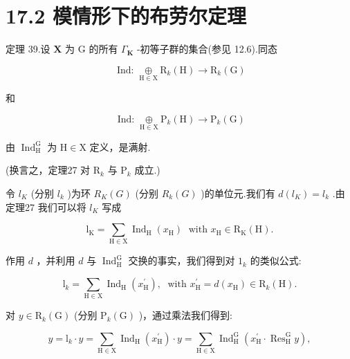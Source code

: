 \documentclass[10pt]{article}
\begin{document}
\section*{17.2 模情形下的布劳尔定理}

定理 39.设 \(\mathbf{X}\) 为 \(\mathrm{G}\) 的所有 \({\Gamma }_{\mathbf{K}}\) -初等子群的集合(参见 12.6).同态

\[
\text{ Ind: }\mathop{\oplus }\limits_{{\mathrm{H} \in  \mathrm{X}}}{\mathrm{R}}_{k}\left( \mathrm{H}\right)  \rightarrow  {\mathrm{R}}_{k}\left( \mathrm{G}\right)
\]

和

\[
\text{ Ind: }\mathop{\oplus }\limits_{{\mathrm{H} \in  \mathrm{X}}}{\mathrm{P}}_{k}\left( \mathrm{H}\right)  \rightarrow  {\mathrm{P}}_{k}\left( \mathrm{G}\right)
\]

由 \({\operatorname{Ind}}_{\mathrm{H}}^{\mathrm{G}}\) 为 \(\mathrm{H} \in  \mathrm{X}\) 定义，是满射.

(换言之，定理27 对 \({\mathrm{R}}_{k}\) 与 \({\mathrm{P}}_{k}\) 成立.)

令 \({l}_{K}\) (分别 \({l}_{k}\) )为环 \({R}_{K}\left( G\right)\) (分别 \({R}_{k}\left( G\right)\) )的单位元.我们有 \(d\left( {l}_{K}\right)  = {l}_{k}\) .由定理27 我们可以将 \({l}_{K}\) 写成

\[
{\mathrm{l}}_{\mathrm{K}} = \mathop{\sum }\limits_{{\mathrm{H} \in  \mathrm{X}}}{\operatorname{Ind}}_{\mathrm{H}}\left( {x}_{\mathrm{H}}\right) \;\text{ with }{x}_{\mathrm{H}} \in  {\mathrm{R}}_{\mathrm{K}}\left( \mathrm{H}\right) .
\]

作用 \(d\) ，并利用 \(d\) 与 \({\operatorname{Ind}}_{\mathrm{H}}^{\mathrm{G}}\) 交换的事实，我们得到对 \({1}_{k}\) 的类似公式:

\[
{\mathrm{l}}_{k} = \mathop{\sum }\limits_{{\mathrm{H} \in  \mathrm{X}}}{\operatorname{Ind}}_{\mathrm{H}}\left( {x}_{\mathrm{H}}^{\prime }\right) ,\;\text{ with }{x}_{\mathrm{H}}^{\prime } = d\left( {x}_{\mathrm{H}}\right)  \in  {\mathrm{R}}_{k}\left( \mathrm{H}\right) .
\]

对 \(y \in  {\mathrm{R}}_{k}\left( \mathrm{G}\right)\) (分别 \({\mathrm{P}}_{k}\left( \mathrm{G}\right)\) )，通过乘法我们得到:

\[
y = {\mathrm{l}}_{k} \cdot  y = \mathop{\sum }\limits_{{\mathrm{H} \in  \mathrm{X}}}{\operatorname{Ind}}_{\mathrm{H}}\left( {x}_{\mathrm{H}}^{\prime }\right)  \cdot  y = \mathop{\sum }\limits_{{\mathrm{H} \in  \mathrm{X}}}{\operatorname{Ind}}_{\mathrm{H}}^{\mathrm{G}}\left( {{x}_{\mathrm{H}}^{\prime } \cdot  {\operatorname{Res}}_{\mathrm{H}}^{\mathrm{G}}y}\right) ,
\]
\end{document}
